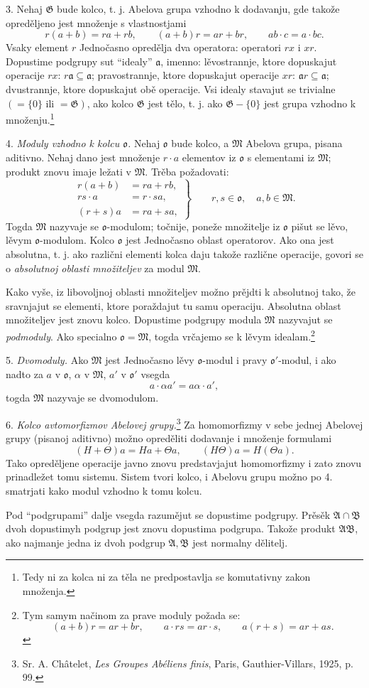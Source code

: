 \documentclass[11pt]{article}
\providecommand{\mG}{\mathfrak{G}}
\providecommand{\mA}{\mathfrak{A}}
\providecommand{\mB}{\mathfrak{B}}
\providecommand{\mM}{\mathfrak{M}}
\providecommand{\mo}{\mathfrak{o}}
\begin{document}
3. Nehaj $\mG$ bude kolco, t. j. Abelova grupa vzhodno k dodavanju, gde takože opreděljeno jest množenje s vlastnostjami
\[
        r(a+b)=ra+rb,\qquad (a+b)r=ar+br,\qquad ab\cdot c=a\cdot bc.
\]
Vsaky element $r$ Jednočasno opredělja dva operatora: operatori $rx$ i $xr$. Dopustime podgrupy sut “idealy” $\mathfrak a$, imenno: lěvostrannje, ktore dopuskajut operacije $rx$: $r\mathfrak a\subseteq\mathfrak a$; pravostrannje, ktore dopuskajut operacije $xr$: $\mathfrak a r\subseteq\mathfrak a$; dvustrannje, ktore dopuskajut obě operacije. Vsi idealy stavajut se trivialne $(=\{0\}\text{ ili }=\mG)$, ako kolco $\mG$ jest tělo, t. j. ako $\mG-\{0\}$ jest grupa vzhodno k množenju.\footnote{Tedy ni za kolca ni za těla ne predpostavlja se komutativny zakon množenja.}

4. \emph{Moduly vzhodno k kolcu $\mo$.} Nehaj $\mo$ bude kolco, a $\mM$ Abelova grupa, pisana aditivno. Nehaj dano jest množenje $r\cdot a$ elementov iz $\mo$ s elementami iz $\mM$; produkt znovu imaje ležati v $\mM$. Trěba požadovati:
\[
\left.
\begin{aligned}
 r(a+b)&=ra+rb,\\
 rs\cdot a&=r\cdot sa,\\
 (r+s)a&=ra+sa,
\end{aligned}
\right\}\qquad r,s\in\mo,\quad a,b\in\mM.
\]
Togda $\mM$ nazyvaje se $\mo$-modulom; točnije, poneže množitelje iz $\mo$ pišut se lěvo, lěvym $\mo$-modulom. Kolco $\mo$ jest Jednočasno oblast operatorov. Ako ona jest absolutna, t. j. ako različni elementi kolca daju takože različne operacije, govori se o \emph{absolutnoj oblasti množiteljev} za modul $\mM$.

Kako vyše, iz libovoljnoj oblasti množiteljev možno prějdti k absolutnoj tako, že sravnjajut se elementi, ktore poraždajut tu samu operaciju. Absolutna oblast množiteljev jest znovu kolco. Dopustime podgrupy modula $\mM$ nazyvajut se \emph{podmoduly}. Ako specialno $\mo=\mM$, togda vrčajemo se k lěvym idealam.\footnote{Tym samym načinom za prave moduly požada se:
\[
(a+b)r=ar+br,\qquad a\cdot rs=ar\cdot s,\qquad a(r+s)=ar+as.
\]}

5. \emph{Dvomoduly.} Ako $\mM$ jest Jednočasno lěvy $\mo$-modul i pravy $\mo'$-modul, i ako nadto za $a$ v $\mo$, $\alpha$ v $\mM$, $a'$ v $\mo'$ vsegda
\[
        a\cdot\alpha a'=a\alpha\cdot a',
\]
togda $\mM$ nazyvaje se dvomodulom.

6. \emph{Kolco avtomorfizmov Abelovej grupy.}\footnote{Sr. A. Châtelet, \emph{Les Groupes Abéliens finis}, Paris, Gauthier-Villars, 1925, p. 99.} Za homomorfizmy v sebe jednej Abelovej grupy (pisanoj aditivno) možno opreděliti dodavanje i množenje formulami
\[
        (H+\Theta)a=Ha+\Theta a,\qquad (H\Theta)a=H(\Theta a).
\]
Tako opreděljene operacije javno znovu predstavjajut homomorfizmy i zato znovu prinadležet tomu sistemu. Sistem tvori kolco, i Abelovu grupu možno po 4. smatrjati kako modul vzhodno k tomu kolcu.

Pod “podgrupami” dalje vsegda razumějut se dopustime podgrupy. Prěsěk $\mA\cap\mB$ dvoh dopustimyh podgrup jest znovu dopustima podgrupa. Takože produkt $\mA\mB$, ako najmanje jedna iz dvoh podgrup $\mA,\mB$ jest normalny dělitelj.
\end{document}
